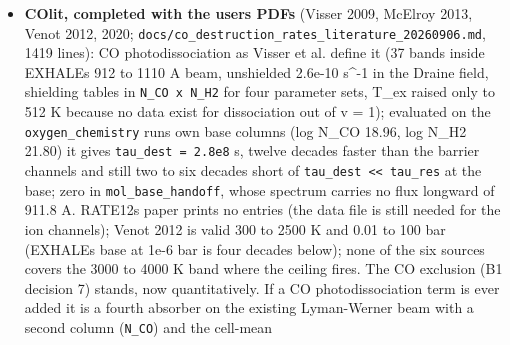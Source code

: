 \documentclass[english,a4paper]{my_memo}
\begin{document}
\begin{itemize}
  the table\textquotesingle s \texttt{1e6\ cm\^{}-3} the non-LTE factor follows the exact collisional
  limit (linear in \texttt{n\_H2}, zero at zero), replacing the clamp at the lowest
  column; above \texttt{1e14} the table edge is held; the four Table 5 segments do
  not join (measured with the paper\textquotesingle s coefficients: +43 percent at 300 K,
  -0.11 percent at 800 K, -2.4 percent at 1800 K) and the code joins them by
  a stated linear blend in \texttt{log\_e\ E} over the 5 percent below each join
  (Table 6\textquotesingle s 300 K value supports the upper polynomial); B1 T6.3 reworded to
  say so. Published values reproduced per segment to the paper\textquotesingle s precision.
  Impact: the H3+ cooling peak unmoved; T moves 1e-5 to 2.7e-4 in the three
  molecular cases; the clamp removal changes cells beyond 1.22 Rp where
  \texttt{n\_H2\ \textless{}\ 1e6} by more than 50 percent at 1e-10 of the peak (emission from
  gas with no collision partners, gone); \texttt{wasp\_full} identical. Four domain
  counters exposed (B6 wiring is the certification owner\textquotesingle s).
\item
  \textbf{COlit, completed with the user\textquotesingle s PDFs} (Visser 2009, McElroy 2013,
  Venot 2012, 2020; \texttt{docs/co\_destruction\_rates\_literature\_20260906.md}, 1419
  lines): CO photodissociation as Visser et al. define it (37 bands inside
  EXHALE\textquotesingle s 912 to 1110 A beam, unshielded 2.6e-10 s\^{}-1 in the Draine field,
  shielding tables in \texttt{N\_CO\ x\ N\_H2} for four parameter sets, T\_ex raised only
  to 512 K because no data exist for dissociation out of v\textquotesingle\textquotesingle{} = 1); evaluated
  on the \texttt{oxygen\_chemistry} run\textquotesingle s own base columns (log N\_CO 18.96, log N\_H2
  21.80) it gives \texttt{tau\_dest\ =\ 2.8e8} s, twelve decades faster than the
  barrier channels and still two to six decades short of \texttt{tau\_dest\ \textless{}\textless{}\ tau\_res} at the base; zero in \texttt{mol\_base\_handoff}, whose spectrum carries no
  flux longward of 911.8 A. RATE12\textquotesingle s paper prints no entries (the data file
  is still needed for the ion channels); Venot 2012 is valid 300 to 2500 K
  and 0.01 to 100 bar (EXHALE\textquotesingle s base at 1e-6 bar is four decades below);
  none of the six sources covers the 3000 to 4000 K band where the ceiling
  fires. The CO exclusion (B1 decision 7) stands, now quantitatively. If a
  CO photodissociation term is ever added it is a fourth absorber on the
  existing Lyman-Werner beam with a second column (\texttt{N\_CO}) and the cell-mean

\end{itemize}
\end{document}
